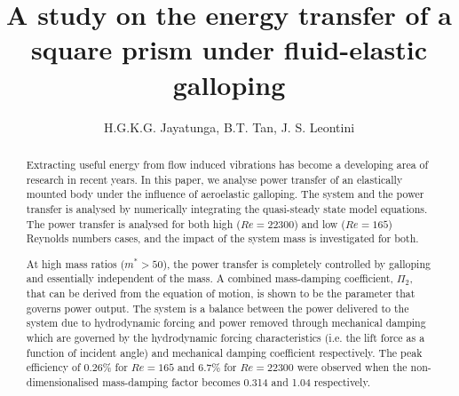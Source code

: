 \documentclass[preprint,authoryear,12pt]{elsarticle}
\newcommand{\reynoldsnumber}{\ensuremath{Re}}
\newcommand{\massdamp}{\ensuremath{\Pi_2}}
\begin{document}
\begin{frontmatter}



\title{A study on the energy transfer of a square prism under fluid-elastic galloping}


\author{H.G.K.G. Jayatunga, B.T. Tan, J. S. Leontini}

\address{}

\begin{abstract}
Extracting useful energy from flow induced vibrations has become a developing area of research in recent years. In this paper, we analyse power transfer of an elastically mounted body under the influence of aeroelastic galloping. The system and the power transfer is analysed by numerically integrating the quasi-steady state model equations. The power transfer is analysed for both high ($\reynoldsnumber=22300$) and low ($\reynoldsnumber=165$) Reynolds numbers cases, and the impact of the system mass is investigated for both.

At high mass ratios ($m^*>50$), the power transfer is completely controlled by galloping and essentially independent of the mass. A combined mass-damping coefficient, \massdamp, that can be derived from the equation of motion, is shown to be the parameter that governs power output. The system is a balance between the power delivered to the system due to hydrodynamic forcing and power removed through mechanical damping which are governed by the hydrodynamic forcing characteristics (i.e. the lift force as a function of incident angle) and mechanical damping coefficient respectively.  The peak efficiency of $0.26\%$ for $\reynoldsnumber=165$ and $6.7\%$ for $\reynoldsnumber=22300$ were observed when the non-dimensionalised mass-damping factor becomes 0.314 and 1.04 respectively.


\end{abstract}
\end{frontmatter}
\end{document}
